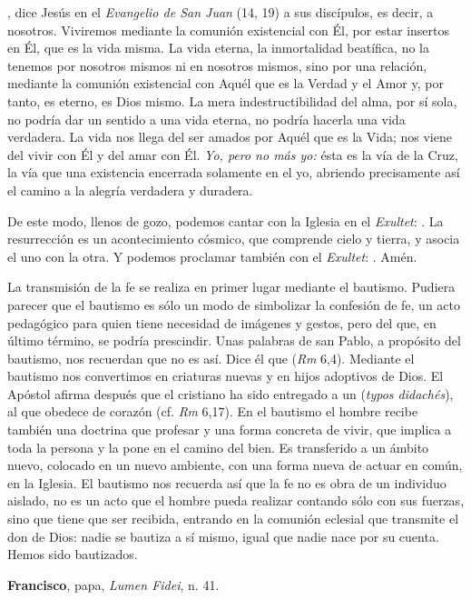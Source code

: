 \begin{body}
, dice Jesús en el \textit{Evangelio de San Juan} (14, 19) a sus discípulos, es decir, a nosotros. Viviremos mediante la comunión existencial con Él, por estar insertos en Él, que es la vida misma. La vida eterna, la inmortalidad beatífica, no la tenemos por nosotros mismos ni en nosotros mismos, sino por una relación, mediante la comunión existencial con Aquél que es la Verdad y el Amor y, por tanto, es eterno, es Dios mismo. La mera indestructibilidad del alma, por sí sola, no podría dar un sentido a una vida eterna, no podría hacerla una vida verdadera. La vida nos llega del ser amados por Aquél que es la Vida; nos viene del vivir con Él y del amar con Él. \textit{Yo, pero no más yo:} ésta es la vía de la Cruz, la vía que  una existencia encerrada solamente en el yo, abriendo precisamente así el camino a la alegría verdadera y duradera.

De este modo, llenos de gozo, podemos cantar con la Iglesia en el \textit{Exultet}: . La resurrección es un acontecimiento cósmico, que comprende cielo y tierra, y asocia el uno con la otra. Y podemos proclamar también con el \textit{Exultet}: . Amén.
\end{body}

\begin{patercite}
La transmisión de la fe se realiza en primer lugar mediante el bautismo. Pudiera parecer que el bautismo es sólo un modo de simbolizar la confesión de fe, un acto pedagógico para quien tiene necesidad de imágenes y gestos, pero del que, en último término, se podría prescindir. Unas palabras de san Pablo, a propósito del bautismo, nos recuerdan que no es así. Dice él que  (\textit{Rm} 6,4). Mediante el bautismo nos convertimos en criaturas nuevas y en hijos adoptivos de Dios. El Apóstol afirma después que el cristiano ha sido entregado a un  (\textit{typos didachés}), al que obedece de corazón (cf. \textit{Rm} 6,17). En el bautismo el hombre recibe también una doctrina que profesar y una forma concreta de vivir, que implica a toda la persona y la pone en el camino del bien. Es transferido a un ámbito nuevo, colocado en un nuevo ambiente, con una forma nueva de actuar en común, en la Iglesia. El bautismo nos recuerda así que la fe no es obra de un individuo aislado, no es un acto que el hombre pueda realizar contando sólo con sus fuerzas, sino que tiene que ser recibida, entrando en la comunión eclesial que transmite el don de Dios: nadie se bautiza a sí mismo, igual que nadie nace por su cuenta. Hemos sido bautizados. 
	
	\textbf{Francisco}, papa, \textit{Lumen Fidei}, n. 41.
\end{patercite}


